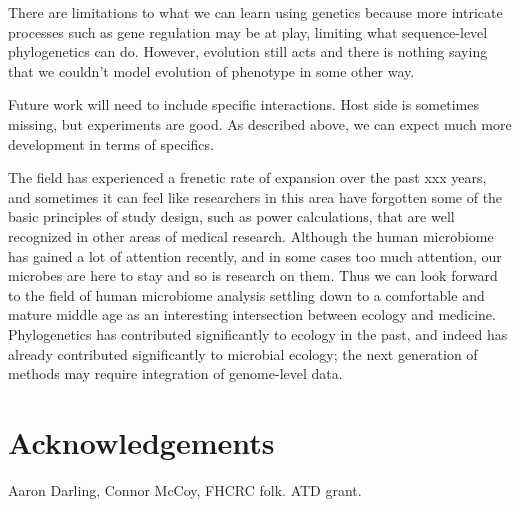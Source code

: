 \documentclass{amsart}
\newcommand{\forarxiv}[1]{#1}
\newcommand{\notforarxiv}[1]{}
\newcommand{\FIGmassTransport}{\
\begin{figure}[ht]
\begin{center}
  \forarxiv{\texttt{[image: mass\_transport.pdf]}}
\end{center}
\caption{\
  Caption goes here.
}
\label{FIGmassTransport}
\end{figure}
}
\begin{document}
There are limitations to what we can learn using genetics because more intricate processes such as gene regulation may be at play, limiting what sequence-level phylogenetics can do.
However, evolution still acts and there is nothing saying that we couldn't model evolution of phenotype in some other way.

Future work will need to include specific interactions.
Host side is sometimes missing, but experiments are good.
As described above, we can expect much more development in terms of specifics.
\citep{hooper2012interactions}

The field has experienced a frenetic rate of expansion over the past xxx years, and sometimes it can feel like researchers in this area have forgotten some of the basic principles of study design, such as power calculations, that are well recognized in other areas of medical research.
Although the human microbiome has gained a lot of attention recently, and in some cases too much attention, our microbes are here to stay and so is research on them.
Thus we can look forward to the field of human microbiome analysis settling down to a comfortable and mature middle age as an interesting intersection between ecology and medicine.
Phylogenetics has contributed significantly to ecology in the past, and indeed has already contributed significantly to microbial ecology; the next generation of methods may require integration of genome-level data.



\section{Acknowledgements}
Aaron Darling, Connor McCoy,
FHCRC folk.
ATD grant.


\notforarxiv{
\newpage
\section{Figure Legends}
\clearpage

\newpage
}



\end{document}
